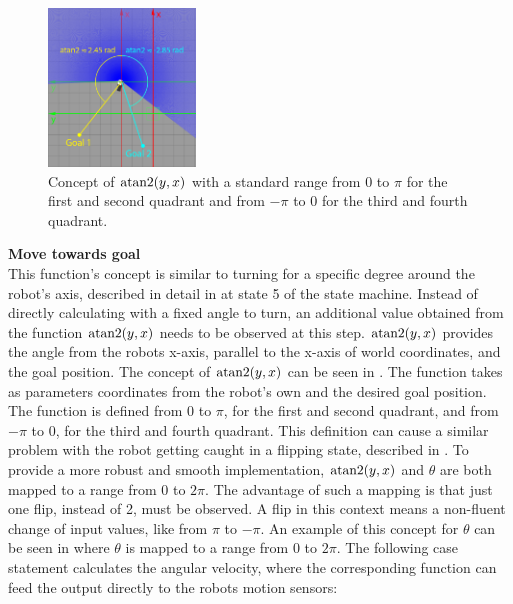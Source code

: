 \begin{figure}
\centering
\includegraphics[width=0.35\textwidth]{Bilder/atan2.png}
\captionsetup{width=0.35\textwidth}
\caption{Concept of $\operatorname{atan2}(y,x)$ with a standard range from $0$ to $\pi$ for the first and second quadrant and from $-\pi$ to $0$ for the third and fourth quadrant.}
\label{atan2}
\vspace{10pt}
\end{figure}

\textbf{Move towards goal}\\
This function's concept is similar to turning for a specific degree around the robot's axis, described in detail in  at state 5 of the state machine. Instead of directly calculating with a fixed angle to turn, an additional value obtained from the function $\operatorname{atan2}(y,x)$ needs to be observed at this step. $\operatorname{atan2}(y,x)$ provides the angle from the robots x-axis, parallel to the x-axis of world coordinates, and the goal position. The concept of $\operatorname{atan2}(y,x)$ can be seen in . The function takes as parameters coordinates from the robot's own and the desired goal position. The function is defined from $0$ to $\pi$, for the first and second quadrant, and from $-\pi$ to $0$, for the third and fourth quadrant. This definition can cause a similar problem with the robot getting caught in a flipping state, described in . To provide a more robust and smooth implementation, $\operatorname{atan2}(y,x)$ and $\theta$ are both mapped to a range from $0$ to $2\pi$. The advantage of such a mapping is that just one flip, instead of 2, must be observed. A flip in this context means a non-fluent change of input values, like from $\pi$ to $-\pi$. An example of this concept for $\theta$ can be seen in  where $\theta$ is mapped to a range from $0$ to $2\pi$. The following case statement calculates the angular velocity, where the corresponding function can feed the output directly to the robots  motion sensors:

